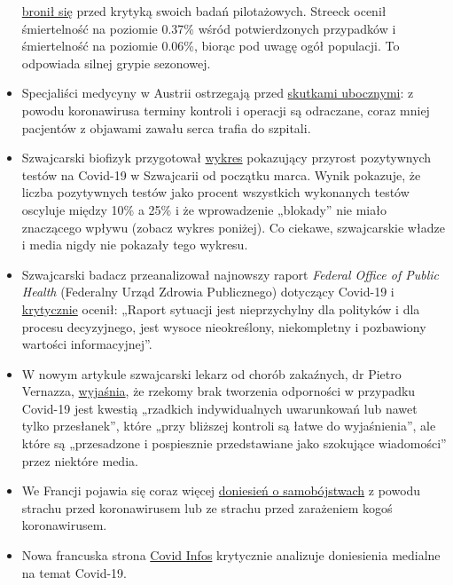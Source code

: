 \begin{itemize}
  \href{https://www.tagesspiegel.de/wissen/virologe-streeck-zur-coronavirus-studie-die-veroeffentlichung-zu-heinsberg-war-nicht-leichtfertig/25735672.html}{bronił
  się} przed krytyką swoich badań pilotażowych. Streeck ocenił
  śmiertelność na poziomie 0.37\% wśród potwierdzonych przypadków i
  śmiertelność na poziomie 0.06\%, biorąc pod uwagę ogół populacji. To
  odpowiada silnej grypie sezonowej.
\item
  Specjaliści medycyny w Austrii ostrzegają przed
  \href{https://wien.orf.at/stories/3044064}{skutkami ubocznymi}: z
  powodu koronawirusa terminy kontroli i operacji są odraczane, coraz
  mniej pacjentów z objawami zawału serca trafia do szpitali.
\item
  Szwajcarski biofizyk przygotował
  \href{https://swprs.org/rate-of-positive-covid19-tests/}{wykres}
  pokazujący przyrost pozytywnych testów na Covid-19 w Szwajcarii od
  początku marca. Wynik pokazuje, że liczba pozytywnych testów jako
  procent wszystkich wykonanych testów oscyluje między 10\% a 25\% i że
  wprowadzenie „blokady'' nie miało znaczącego wpływu (zobacz wykres
  poniżej). Co ciekawe, szwajcarskie władze i media nigdy nie pokazały
  tego wykresu.
\item
  Szwajcarski badacz przeanalizował najnowszy raport \emph{Federal
  Office of Public Health} (Federalny Urząd Zdrowia Publicznego)
  dotyczący Covid-19 i
  \href{https://covid-19-fakten.blogspot.com/2020/04/der-bag-situationsbericht-vom-1442020.html}{krytycznie}
  ocenił: „Raport sytuacji jest nieprzychylny dla polityków i dla
  procesu decyzyjnego, jest wysoce nieokreślony, niekompletny i
  pozbawiony wartości informacyjnej''.
\item
  W nowym artykule szwajcarski lekarz od chorób zakaźnych, dr Pietro
  Vernazza,
  \href{https://infekt.ch/2020/04/hinterlaesst-coronavirus-eine-immunitaet/}{wyjaśnia},
  że rzekomy brak tworzenia odporności w przypadku Covid-19 jest kwestią
  „rzadkich indywidualnych uwarunkowań lub nawet tylko przesłanek'',
  które „przy bliższej kontroli są łatwe do wyjaśnienia'', ale które są
  „przesadzone i pospiesznie przedstawiane jako szokujące wiadomości''
  przez niektóre media.
\item
  We Francji pojawia się coraz więcej
  \href{https://www.midilibre.fr/2020/04/09/coronavirus-ces-suicides-de-malades-ou-de-personnes-tenaillees-par-langoisse,8839373.php}{doniesień
  o samobójstwach} z powodu strachu przed koronawirusem lub ze strachu
  przed zarażeniem kogoś koronawirusem.
\item
  Nowa francuska strona \href{https://covidinfos.net/}{Covid Infos}
  krytycznie analizuje doniesienia medialne na temat Covid-19.
\end{itemize}

